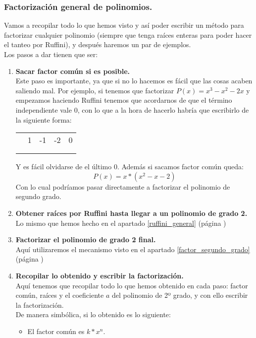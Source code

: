 \documentclass[a4paper,11pt,answers]{exam}
\begin{document}
\subsubsection{Factorización general de polinomios.}
Vamos a recopilar todo lo que hemos visto y así poder escribir un método para factorizar cualquier polinomio (siempre que tenga raíces enteras para poder hacer el tanteo por Ruffini), y después haremos un par de ejemplos.\\
Los pasos a dar tienen que ser:
\begin{enumerate}
\item \textbf{Sacar factor común si es posible.}\\
  Este paso es importante, ya que si no lo hacemos es fácil que las cosas acaben saliendo mal. Por ejemplo, si tenemos que factorizar $P(x) = x^3-x^2-2x$ y empezamos haciendo Ruffini tenemos que acordarnos de que el término independiente vale $0$, con lo que a la hora de hacerlo habría que escribirlo de la siguiente forma:
  \begin{center}
    \begin{tabular}{r|rrrr}
      &1&-1&-2&0\\
      &&&&\\
      \hline
      &&&&
    \end{tabular}
  \end{center}
  Y es fácil olvidarse de el último $0$. Además si sacamos factor común queda:
  \[P(x) = x*(x^2 - x -2)\]
  Con lo cual podríamos pasar directamente a factorizar el polinomio de segundo grado.
\item \textbf{Obtener raíces por Ruffini hasta llegar a un polinomio de grado 2.}\\
  Lo mismo que hemos hecho en el apartado \ref{ruffini_general} (página \pageref{ruffini_general})
\item \textbf{Factorizar el polinomio de grado 2 final.}\\
  Aquí utilizaremos el mecanismo visto en el apartado \ref{factor_segundo_grado} (página \pageref{factor_segundo_grado})
\item \textbf{Recopilar lo obtenido y escribir la factorización.}\\
  Aquí tenemos que recopilar todo lo que hemos obtenido en cada paso: factor común, raíces y el coeficiente $a$ del polinomio de 2º grado, y con ello escribir la factorización.\\
  De manera simbólica, si lo obtenido es lo siguiente:
  \begin{itemize}
  \item El factor común es $k*x^n$.

\end{itemize}
\end{enumerate}
\end{document}
